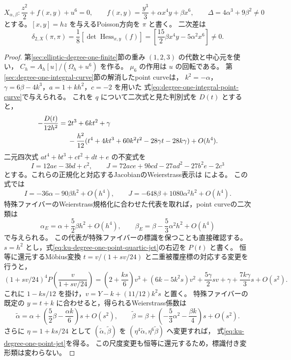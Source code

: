 \begin{theorem}[次数1の二次差]
\label{thm:ku-degree-one-quadratic-obstruction}
\[
 X_{\alpha,\beta}:
 \frac{z^2}{2}+f(x,y)+u^6=0,
 \qquad f(x,y)=\frac{y^3}{3}+\alpha x^4y+\beta x^6,
 \qquad \Delta=4\alpha^3+9\beta^2\ne0
\]
とする。$[x,y]=hz$ を与えるPoisson方向を $\pi$ と書く。
二次差は
\begin{equation}\label{eq:ku-degree-one-hessian-obstruction}
 \delta_{2,X}(\pi,\pi)
  =\frac18[\det\operatorname{Hess}_{x,y}(f)]
  =\left[\frac{15}{2}\beta x^4y-5\alpha^2x^6\right]
  \ne0.
\end{equation}
\end{theorem}
\begin{proof}
第\ref{sec:elliptic-degree-one-finite}節の重み $(1,2,3)$ の代数と中心元を使い，
$C_h=A_h[u]/(\Omega_h+u^6)$ を作る。
$\mu_6$ の作用は $u$ の回転である。
第\ref{sec:degree-one-integral-curve}節の解消したpoint curveは，
$k^2=-\alpha$，$\gamma=6\beta-4k^3$，$a=1+kh^2$，$c=-2$ を用いた
式\eqref{eq:degree-one-integral-point-curve}で与えられる。
これを $q$ について二次式と見た判別式を $D(t)$ とすると，
\begin{align}
 -\frac{D(t)}{12h^2}
 ={}&2t^3+6kt^2+\gamma\notag\\
 &-\frac{h^2}{12}
  (t^4+4kt^3+60k^2t^2-28\gamma t-28k\gamma)+O(h^4).
 \label{eq:ku-degree-one-point-quartic-jet}
\end{align}
二元四次式 $at^4+bt^3+ct^2+dt+e$ の不変式を
\[
 I=12ae-3bd+c^2,\qquad
 J=72ace+9bcd-27ad^2-27b^2e-2c^3
\]
とする。これらの正規化と対応するJacobianのWeierstrass表示は
\cite[Section~2, equations~(1)--(2)]{Fisher2022}による。
この式では
\[
 I=-36\alpha-90\beta h^2+O(h^4),\qquad
 J=-648\beta+1080\alpha^2h^2+O(h^4).
\]
特殊ファイバーのWeierstrass規格化に合わせた代表を取れば，point curveの二次類は
\begin{equation}\label{eq:ku-degree-one-point-jet}
 \alpha_E=\alpha+\frac52\beta h^2+O(h^4),\qquad
 \beta_E=\beta-\frac53\alpha^2h^2+O(h^4)
\end{equation}
で与えられる。
この代表が特殊ファイバーの標識を保つことも直接確認する。
$s=h^2$ とし，式\eqref{eq:ku-degree-one-point-quartic-jet}の右辺を $P(t)$ と書く。
恒等に還元するM\"obius変換
$t=v/(1+sv/24)$ と二重被覆座標の対応する変更を行うと，
\[
 (1+sv/24)^4P\!\left(\frac{v}{1+sv/24}\right)
 =\left(2+\frac{ks}{6}\right)v^3
 +(6k-5k^2s)v^2+\frac{5\gamma}{2}sv
 +\gamma+\frac{7k\gamma}{3}s+O(s^2).
\]
これに $1-ks/12$ を掛け，$v=Y-k+(11/12)k^2s$ と置く。
特殊ファイバーの既定の $y=t+k$ に合わせると，得られるWeierstrass係数は
\[
 \widetilde\alpha
   =\alpha+\left(\frac52\beta-\frac{\alpha k}{6}\right)s+O(s^2),
 \qquad
 \widetilde\beta
   =\beta+\left(-\frac53\alpha^2-\frac{\beta k}{4}\right)s+O(s^2).
\]
さらに $\eta=1+ks/24$ として
$(\widetilde\alpha,\widetilde\beta)$ を
$(\eta^4\widetilde\alpha,\eta^6\widetilde\beta)$ へ変更すれば，
式\eqref{eq:ku-degree-one-point-jet}を得る。
この尺度変更も恒等に還元するため，標識付き変形類は変わらない。


\end{proof}
